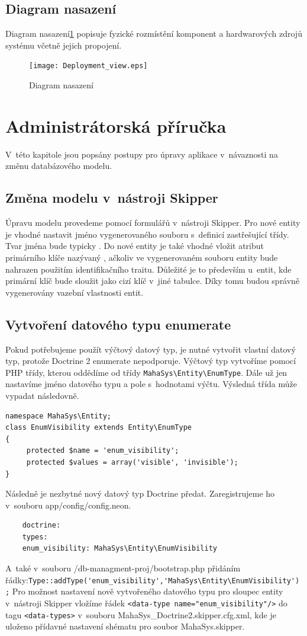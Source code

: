 \documentclass[thesis=B,czech]{FITthesis}[2012/06/26]
\begin{document}
\subsection{Diagram nasazení}
	Diagram nasazení\ref{deployment_view} popisuje fyzické rozmístění komponent a hardwarových zdrojů systému včetně jejich propojení.\cite{si1_pred7}

\begin{figure}
	\texttt{[image: Deployment\_view.eps]}
	\caption{Diagram nasazení}\label{deployment_view}
\end{figure}
	
\section{Administrátorská příručka}
	V~této kapitole jsou popsány postupy pro úpravy aplikace v~návaznosti na změnu databázového modelu.
\subsection{Změna modelu v~nástroji Skipper}
	Úpravu modelu provedeme pomocí formulářů v~nástroji Skipper. Pro nové entity je vhodné nastavit jméno vygenerovaného souboru s~definicí zastřešující třídy. Tvar jména bude typicky . Do nové entity je také vhodné vložit atribut primárního klíče nazývaný , ačkoliv ve vygenerovaném souboru entity bude nahrazen použitím identifikačního traitu. Důležité je to především u~entit, kde primární klíč bude sloužit jako cizí klíč v~jiné tabulce. Díky tomu budou správně vygenerovány vazební vlastnosti entit.
\subsection{Vytvoření datového typu enumerate}
	Pokud potřebujeme použít výčtový datový typ, je nutné vytvořit vlastní datový typ, protože Doctrine 2 enumerate nepodporuje. Výčtový typ vytvoříme pomocí PHP třídy, kterou oddědíme od třídy \verb|MahaSys\Entity\EnumType|. Dále už jen nastavíme jméno datového typu a pole s~hodnotami výčtu. Výsledná třída může vypadat následovně.
	\begin{verbatim}
namespace MahaSys\Entity;
class EnumVisibility extends Entity\EnumType
{
     protected $name = 'enum_visibility';
     protected $values = array('visible', 'invisible');
}
	\end{verbatim}
	Následně je nezbytné nový datový typ Doctrine předat. Zaregistrujeme ho v~souboru app/config/config.neon.
	\begin{verbatim}
	doctrine:
	types: 
	enum_visibility: MahaSys\Entity\EnumVisibility
	\end{verbatim}
	A~také v~souboru /db-managment-proj/bootstrap.php přidáním řádky:\newline\verb|Type::addType('enum_visibility','MahaSys\Entity\EnumVisibility');|
Pro možnost nastavení nově vytvořeného datového typu pro sloupec entity v~nástroji Skipper vložíme řádek \verb|<data-type name="enum_visibility"/>| do tagu \verb|<data-types>| v~souboru MahaSys\_Doctrine2.skipper.cfg.xml, kde je uloženo přídavné nastavení shématu pro soubor MahaSys.skipper.
\end{document}
